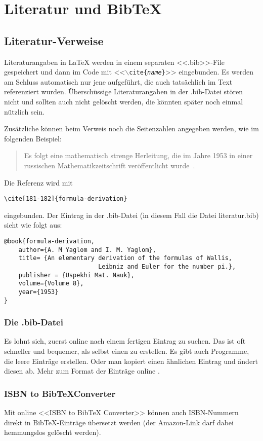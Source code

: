 \chapter{Literatur und Bib\TeX} \label{ch:literatur}
\section{Literatur-Verweise}
Literaturangaben in \LaTeX{} \cite{lamport-latex} werden in einem
separaten <<.bib>>-File gespeichert und dann im Code mit <<{\tt$\backslash$cite\{{\em name}\}}>> eingebunden. 
Es werden am Schluss automatisch nur jene aufgeführt, die auch tatsächlich im
Text referenziert wurden. Überschüssige Literaturangaben in der .bib-Datei 
stören nicht und sollten auch nicht gelöscht werden, die könnten später noch
einmal nützlich sein.

Zusätzliche können beim Verweis noch die Seitenzahlen angegeben werden, wie 
im folgenden Beispiel:
\begin{quote}
Es folgt eine mathematisch strenge Herleitung, die im Jahre 1953 in einer russischen Mathematikzeitschrift
	veröffentlicht wurde~\cite[181-182]{formula-derivation}.
\end{quote}
Die Referenz wird mit 
\begin{verbatim}
\cite[181-182]{formula-derivation}
\end{verbatim}
eingebunden. Der Eintrag in der .bib-Datei (in diesem Fall die Datei
literatur.bib) sieht wie folgt aus:

\begin{verbatim}
@book{formula-derivation,
    author={A. M Yaglom and I. M. Yaglom},
    title= {An elementary derivation of the formulas of Wallis, 
	                      Leibniz and Euler for the number pi.},
    publisher = {Uspekhi Mat. Nauk},
    volume={Volume 8},
    year={1953}
}
\end{verbatim}

\subsection{Die .bib-Datei}
Es lohnt sich, zuerst online nach einem fertigen Eintrag zu
suchen. Das ist oft schneller und bequemer, als selbst einen zu
erstellen. Es gibt auch Programme, die
leere Einträge erstellen. Oder man kopiert einen ähnlichen
Eintrag und ändert diesen ab.
Mehr zum Format der Einträge online \cite{bibtex}.


\subsection{ISBN to Bib\TeX{}Converter}
Mit online <<ISBN to Bib\TeX{} Converter>>
\cite{isbn2bibtex} können auch ISBN-Nummern direkt in
Bib\TeX{}-Einträge übersetzt werden (der Amazon-Link darf dabei
hemmungslos gelöscht werden).

